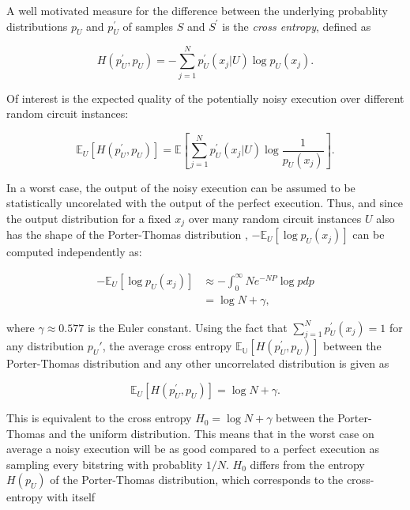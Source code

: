 A well motivated measure for the difference between the underlying
probablity distributions $p_U$ and $p_U^{\prime}$ of samples $S$ and $S^{\prime}$ is the \textit{cross entropy}, defined as


\begin{equation}
  H(p_U^{\prime},p_U) = - \sum_{j=1}^Np_U^{\prime}(x_j|U) \log{p_U(x_j)}.
\end{equation}

Of interest is the expected quality of the potentially noisy execution over
different random circuit instances:

\begin{equation}
  \mathbb{E}_U[H(p_U^{\prime},p_U)] = \mathbb{E} [\sum_{j=1}^Np_U^{\prime}(x_j|U)\log{\frac{1}{p_U(x_j)}}].
\end{equation}

In a worst case, the output of the noisy execution can be assumed to
be statistically uncorelated with the output of the perfect execution. Thus,
and since the output distribution for a fixed $x_j$ over many random circuit
instances $U$ also has the shape of the Porter-Thomas distribution \cite{harrow2008random},
$-\mathbb{E}_U[\log{p_U(x_j)}]$ can be computed independently as: 

\begin{align}
  -\mathbb{E}_U[\log{p_U(x_j)}] &\approx - \int_0^{\infty}Ne^{-NP}\log{p} dp \\
                                &= \log{N} + \gamma,
\end{align}

where $\gamma \approx 0.577$ is the Euler constant.
Using the fact that $\sum_{j=1}^Np_U^{\prime}(x_j) = 1$ for any distribution $p_U{\prime}$, the average cross
entropy $\mathbb{E_U}[H(p_U^{\prime},p_U)]$ between the Porter-Thomas distribution and any other uncorrelated distribution is
given as 

\begin{equation}
  \mathbb{E}_U [H(p_U^{\prime},p_U)] = \log{N} + \gamma.
\end{equation}

This is equivalent to the cross entropy $H_0 = \log{N} + \gamma$ between the
Porter-Thomas and the uniform distribution. This means that in the worst case on
average a noisy execution will be as good compared to a perfect execution as sampling
every bitstring with probablity $1/N$. $H_0$ differs from the entropy $H(p_U)$ of
the Porter-Thomas distribution, which corresponds to the cross-entropy with
itself


